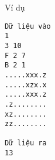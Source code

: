 Ví dụ
\begin{verbatim}
Dữ liệu vào
1
3 10
F 2 7
B 2 1
.....xxx.z
.....xzx.x
.....xxx.z
.z........
xz........
zz........	

Dữ liệu ra
13
\end{verbatim}